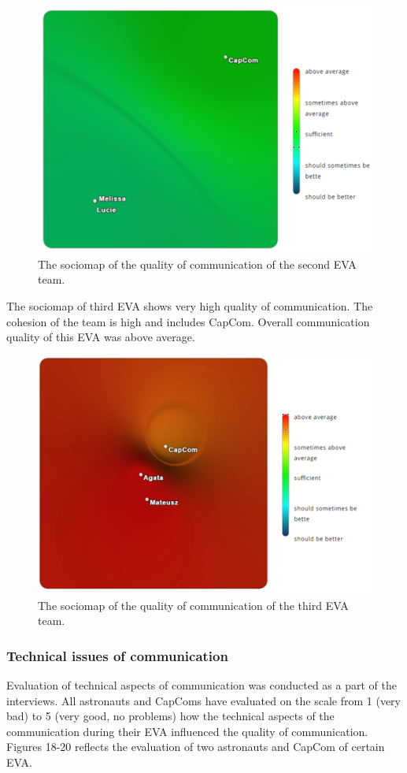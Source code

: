\documentclass[preprint]{elsarticle}
\begin{document}
\begin{figure}
\centering
\includegraphics{img/figure16.png}
\caption{The sociomap of the quality of communication of the second EVA team.}
\label{fig:f16}
\end{figure}

The sociomap of third EVA shows very high quality of communication. The cohesion of the team is high and includes CapCom. Overall communication quality of this EVA was above average.

\begin{figure}
\centering
\includegraphics{img/figure17.png}
\caption{The sociomap of the quality of communication of the third EVA team.}
\label{fig:f17}
\end{figure}

\subsubsection{Technical issues of communication}
Evaluation of technical aspects of communication was conducted as a part of the interviews. All astronauts and CapComs have evaluated on the scale from 1 (very bad) to 5 (very good, no problems) how the technical aspects of the communication during their EVA influenced the quality of communication. Figures 18-20 reflects the evaluation of two astronauts and CapCom of certain EVA.
\end{document}
